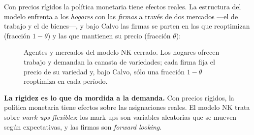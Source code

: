 \documentclass[11pt]{article}
\newenvironment{clave}[1][Idea clave]%
  {\par\medskip\noindent\textbf{#1.}\enspace\ignorespaces}%
  {\par\medskip}
\theoremstyle{definition}
\begin{document}
Con precios rígidos la política monetaria tiene efectos reales. La estructura del modelo enfrenta a
los \emph{hogares} con las \emph{firmas} a través de dos mercados ---el de trabajo y el de bienes---,
y bajo Calvo las firmas se parten en las que reoptimizan (fracción $1-\theta$) y las que mantienen su
precio (fracción $\theta$):

\begin{figure}[h]
\centering
{}
\caption{Agentes y mercados del modelo NK cerrado. Los hogares ofrecen trabajo y demandan la canasta
de variedades; cada firma fija el precio de su variedad y, bajo Calvo, sólo una fracción $1-\theta$
reoptimiza en cada período.}
\end{figure}

\begin{clave}[La rigidez es lo que da mordida a la demanda]
Con precios rígidos, la política monetaria tiene efectos sobre las asignaciones reales. El modelo NK
trata sobre \emph{mark-ups flexibles}: los mark-ups son variables aleatorias que se mueven según
expectativas, y las firmas son \emph{forward looking}.
\end{clave}
\end{document}
